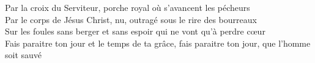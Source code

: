 Par la croix du Serviteur, porche royal où s'avancent les pécheurs\\
Par le corps de Jésus Christ, nu, outragé sous le rire des bourreaux\\
Sur les foules sans berger et sans espoir qui ne vont qu'à perdre cœur\\
Fais paraitre ton jour et le temps de ta grâce, fais paraitre ton jour, que l’homme soit sauvé
